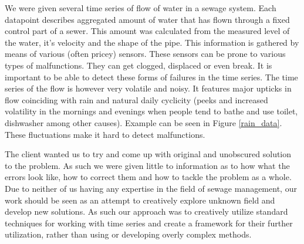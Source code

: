 \documentclass[12pt,a4paper]{article}
\begin{document}
We were given several time series of flow of water in a sewage system. Each datapoint describes aggregated amount of water that has flown through a fixed control part of a sewer. This amount was calculated from the measured level of the water, it's velocity and the shape of the pipe. This information is gathered by means of various (often pricey) sensors. These sensors can be prone to various types of malfunctions. They can get clogged, displaced or even break. It is important to be able to detect these forms of failures in the time series. The time series of the flow is however very volatile and noisy. It features major upticks in flow coinciding with rain and natural daily cyclicity (peeks and increased volatility in the mornings and evenings when people tend to bathe and use toilet, dishwasher among other causes). Example can be seen in Figure \ref{rain_data}. These fluctuations make it hard to detect malfunctions.

The client wanted us to try and come up with original and unobscured solution to the problem. As such we were given little to information as to how what the errors look like, how to correct them and how to tackle the problem as a whole. Due to neither of us having any expertise in the field of sewage management, our work should be seen as an attempt to creatively explore unknown field and develop new solutions. As such our approach was to creatively utilize standard techniques for working with time series and create a framework for their further utilization, rather than using or developing overly complex methods.
\end{document}
